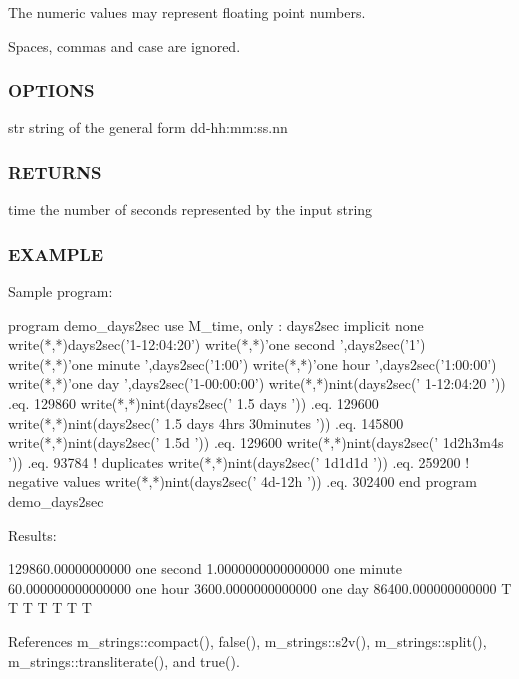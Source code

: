 The numeric values may represent floating point numbers.

Spaces, commas and case are ignored.

\subsubsection*{O\+P\+T\+I\+O\+NS}

str string of the general form dd-\/hh\+:mm\+:ss.\+nn \subsubsection*{R\+E\+T\+U\+R\+NS}

time the number of seconds represented by the input string

\subsubsection*{E\+X\+A\+M\+P\+LE}

\begin{DoxyVerb}Sample program:

 program demo_days2sec
 use M_time, only : days2sec
 implicit none
    write(*,*)days2sec('1-12:04:20')
    write(*,*)'one second ',days2sec('1')
    write(*,*)'one minute ',days2sec('1:00')
    write(*,*)'one hour ',days2sec('1:00:00')
    write(*,*)'one day ',days2sec('1-00:00:00')
    write(*,*)nint(days2sec(' 1-12:04:20              ')) .eq. 129860
    write(*,*)nint(days2sec(' 1.5 days                ')) .eq. 129600
    write(*,*)nint(days2sec(' 1.5 days 4hrs 30minutes ')) .eq. 145800
    write(*,*)nint(days2sec(' 1.5d                    ')) .eq. 129600
    write(*,*)nint(days2sec(' 1d2h3m4s                ')) .eq. 93784
    ! duplicates
    write(*,*)nint(days2sec(' 1d1d1d                  ')) .eq. 259200
    ! negative values
    write(*,*)nint(days2sec(' 4d-12h                  ')) .eq. 302400
 end program demo_days2sec

Results:

 129860.00000000000
 one second    1.0000000000000000
 one minute    60.000000000000000
 one hour    3600.0000000000000
 one day    86400.000000000000
 T
 T
 T
 T
 T
 T
 T \end{DoxyVerb}
 

References m\+\_\+strings\+::compact(), false(), m\+\_\+strings\+::s2v(), m\+\_\+strings\+::split(), m\+\_\+strings\+::transliterate(), and true().

